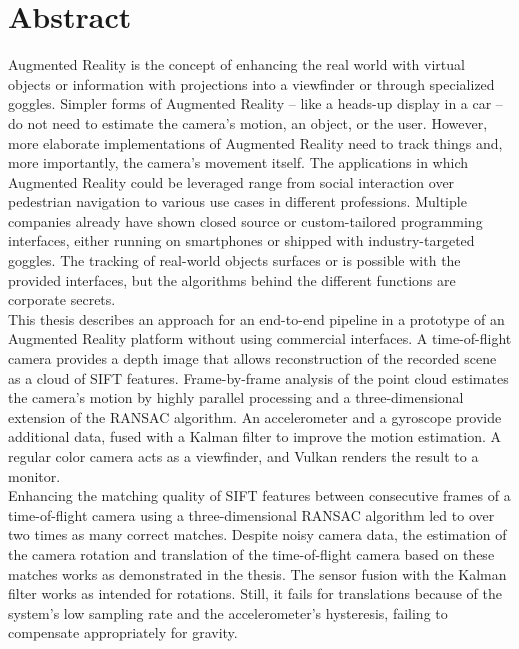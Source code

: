 
\chapter*{Abstract}
\label{sec:Abstract}
Augmented Reality is the concept of enhancing the real world with virtual objects or information with projections into a viewfinder or through specialized goggles. Simpler forms of Augmented Reality – like a heads-up display in a car – do not need to estimate the camera's motion, an object, or the user.  However, more elaborate implementations of Augmented Reality need to track things and, more importantly, the camera's movement itself. The applications in which Augmented Reality could be leveraged range from social interaction over pedestrian navigation to various use cases in different professions. Multiple companies already have shown closed source or custom-tailored programming interfaces, either running on smartphones or shipped with industry-targeted goggles. The tracking of real-world objects surfaces or is possible with the provided interfaces, but the algorithms behind the different functions are corporate secrets.\\ 
This thesis describes an approach for an end-to-end pipeline in a prototype of an Augmented Reality platform without using commercial interfaces. A time-of-flight camera provides a depth image that allows reconstruction of the recorded scene as a cloud of SIFT features. Frame-by-frame analysis of the point cloud estimates the camera's motion by highly parallel processing and a three-dimensional extension of the RANSAC algorithm. An accelerometer and a gyroscope provide additional data, fused with a Kalman filter to improve the motion estimation. A regular color camera acts as a viewfinder, and Vulkan renders the result to a monitor.\\
Enhancing the matching quality of SIFT features between consecutive frames of a time-of-flight camera using a three-dimensional RANSAC algorithm led to over two times as many correct matches. Despite noisy camera data, the estimation of the camera rotation and translation of the time-of-flight camera based on these matches works as demonstrated in the thesis. The sensor fusion with the Kalman filter works as intended for rotations. Still, it fails for translations because of the system's low sampling rate and the accelerometer's hysteresis, failing to compensate appropriately for gravity.


